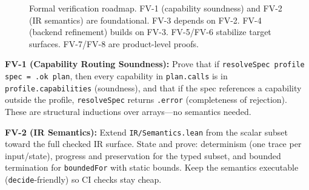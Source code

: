 \documentclass[sigconf]{acmart}
\begin{document}
\begin{figure}[t]
  \centering
  \caption{Formal verification roadmap. FV-1 (capability soundness) and FV-2 (IR semantics)
  are foundational. FV-3 depends on FV-2. FV-4 (backend refinement) builds on FV-3.
  FV-5/FV-6 stabilize target surfaces. FV-7/FV-8 are product-level proofs.}
  \label{fig:fv-roadmap}
\end{figure}

\textbf{FV-1 (Capability Routing Soundness):} Prove that if
\texttt{resolveSpec profile spec = .ok plan}, then every capability in
\texttt{plan.calls} is in \texttt{profile.capabilities} (soundness), and that if the spec
references a capability outside the profile, \texttt{resolveSpec} returns \texttt{.error}
(completeness of rejection). These are structural inductions over arrays---no semantics needed.

\textbf{FV-2 (IR Semantics):} Extend \texttt{IR/Semantics.lean} from the scalar subset toward
the full checked IR surface. State and prove: determinism (one trace per input/state), progress
and preservation for the typed subset, and bounded termination for \texttt{boundedFor} with
static bounds. Keep the semantics executable (\texttt{decide}-friendly) so CI checks stay cheap.
\end{document}
